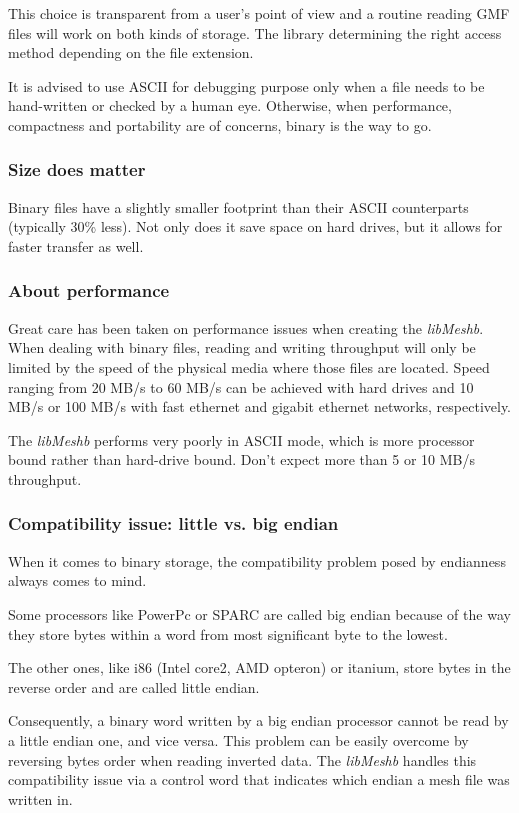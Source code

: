 \documentclass[a4paper,12pt]{article}
\begin{document}
This choice is transparent from a user's point of view and a routine reading GMF files will work on both kinds of storage.
The library determining the right access method depending on the file extension.

It is advised to use ASCII for debugging purpose only when a file needs to be hand-written or checked by a human eye. Otherwise, when performance, compactness and portability are of concerns, binary is the way to go.


\subsubsection{Size does matter}
Binary files have a slightly smaller footprint than their ASCII counterparts (typically 30\% less). Not only does it save space on hard drives, but it allows for faster transfer as well.


\subsubsection{About performance}
Great care has been taken on performance issues when creating the \emph{libMeshb}. When dealing with binary files, reading and writing throughput will only be limited by the speed of the physical media where those files are located. Speed ranging from 20 MB/s to 60 MB/s can be achieved with hard drives and 10 MB/s or 100 MB/s with fast ethernet and gigabit ethernet networks, respectively.

The \emph{libMeshb} performs very poorly in ASCII mode, which is more processor bound rather than hard-drive bound. Don't expect more than 5 or 10 MB/s throughput.

\subsubsection{Compatibility issue: little vs. big endian}
When it comes to binary storage, the compatibility problem posed by endianness always comes to mind.

Some processors like PowerPc or SPARC are called big endian because of the way they store bytes within a word from most significant byte to the lowest.

The other ones, like i86 (Intel core2, AMD opteron) or itanium, store bytes in the reverse order and are called little endian.

Consequently, a binary word written by a big endian processor cannot be read by a little endian one, and vice versa. This problem can be easily overcome by reversing bytes order when reading inverted data. The \emph{libMeshb} handles this compatibility issue via a control word that indicates which endian a mesh file was written in.
\end{document}
